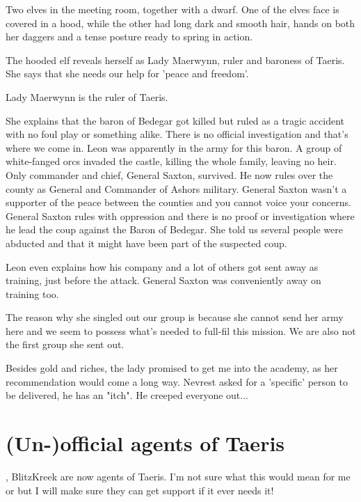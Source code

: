 Two elves in the meeting room, together with a dwarf. One of the elves face is covered in a hood, while the other had long dark and smooth hair, hands on both her daggers and a tense posture ready to spring in action.

The hooded elf reveals herself as Lady Maerwynn, ruler and baroness of Taeris. She says that she needs our help for 'peace and freedom'.

\begin{DndReadAloud}
    Lady Maerwynn is the ruler of Taeris.
\end{DndReadAloud}

She explains that the baron of Bedegar got killed but ruled as a tragic accident with no foul play or something alike. There is no official investigation and that's where we come in. Leon was apparently in the army for this baron.
A group of white-fanged orcs invaded the castle, killing the whole family, leaving no heir. Only commander and chief, General Saxton, survived. He now rules over the county as General and Commander of Ashors military.
General Saxton wasn't a supporter of the peace between the counties and you cannot voice your concerns. General Saxton rules with oppression and there is no proof or investigation where he lead the coup against the Baron of Bedegar.
She told us several people were abducted and that it might have been part of the suspected coup.

\begin{DndReadAloud}
    Leon even explains how his company and a lot of others got sent away as training, just before the attack. General Saxton was conveniently away on training too.
\end{DndReadAloud}

The reason why she singled out our group is because she cannot send her army here and we seem to possess what's needed to full-fil this mission. We are also not the first group she sent out.

Besides gold and riches, the lady promised to get me into the academy, as her recommendation would come a long way. Nevrest asked for a 'specific' person to be delivered, he has an "itch". He creeped everyone out...

\section{(Un-)official agents of Taeris}
\Master{}, BlitzKreek are now agents of Taeris. I'm not sure what this would mean for me or \Cloister{} but I will make sure they can get support if it ever needs it!

